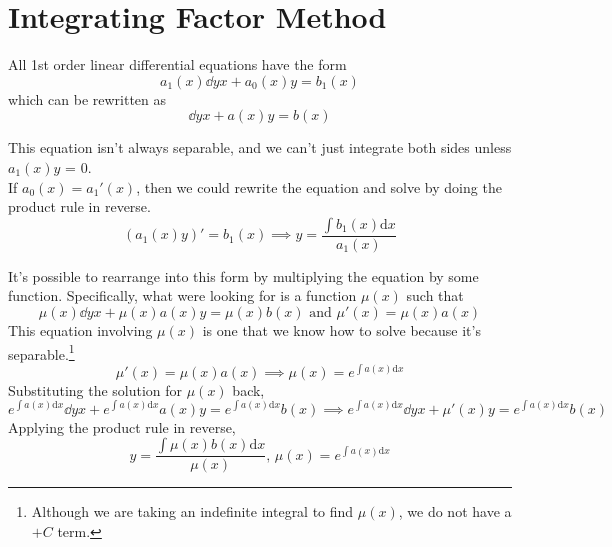 \section{Integrating Factor Method}
All 1st order linear differential equations have the form
\begin{equation*}
	a_1(x)\dd{y}{x} + a_0(x)y = b_1(x)
\end{equation*}
which can be rewritten as
\begin{equation*}
	\dd{y}{x} + a(x)y = b(x)
\end{equation*}

\noindent
This equation isn't always separable, and we can't just integrate both sides unless $a_1(x)y$ = 0.\\

\noindent
If $a_0(x) = a_1'(x)$, then we could rewrite the equation and solve by doing the product rule in reverse.
\begin{equation*}
	\left(a_1(x)y\right)' = b_1(x) \implies y = \frac{\int{b_1(x) \mathrm{d}x}}{a_1(x)}
\end{equation*}

\noindent
It's possible to rearrange into this form by multiplying the equation by some function. Specifically, what were looking for is a function $\mu(x)$ such that
\begin{equation*}
	\mu(x)\dd{y}{x} + \mu(x)a(x)y = \mu(x)b(x) \text{ and } \mu'(x) = \mu(x)a(x)
\end{equation*}
This equation involving $\mu(x)$ is one that we know how to solve because it's separable.\footnote{Although we are taking an indefinite integral to find $\mu(x)$, we do not have a $+ C$ term.}
\begin{equation*}
	\mu'(x) = \mu(x)a(x) \implies \mu(x) = e^{\int{a(x) \mathrm{d}x}}
\end{equation*}
Substituting the solution for $\mu(x)$ back,
\begin{equation*}
	e^{\int{a(x) \mathrm{d}x}}\dd{y}{x} + e^{\int{a(x) \mathrm{d}x}}a(x)y = e^{\int{a(x) \mathrm{d}x}}b(x) \implies e^{\int{a(x) \mathrm{d}x}}\dd{y}{x} + \mu'(x)y = e^{\int{a(x) \mathrm{d}x}}b(x)
\end{equation*}
Applying the product rule in reverse,
\begin{equation*}
	y = \frac{\int{\mu(x)} b(x) \mathrm{d}x}{\mu(x)} \text{, } \mu(x) = e^{\int{a(x) \mathrm{d}x}}
\end{equation*}

